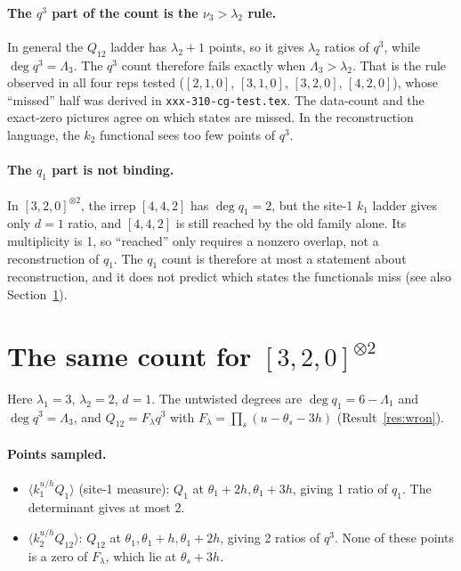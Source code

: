 \documentclass[11pt]{article}
\newcommand{\nb}[1]{\texttt{#1}}
\theoremstyle{definition}
\theoremstyle{remark}
\begin{document}
\paragraph{The $q^3$ part of the count is the $\nu_3>\lambda_2$ rule.} In general the $Q_{12}$ ladder has $\lambda_2+1$ points, so it gives $\lambda_2$ ratios of $q^3$, while $\deg q^3=\Lambda_3$. The $q^3$ count therefore fails exactly when $\Lambda_3>\lambda_2$. That is the rule observed in all four reps tested ($[2,1,0]$, $[3,1,0]$, $[3,2,0]$, $[4,2,0]$), whose ``missed'' half was derived in \nb{xxx-310-cg-test.tex}. The data-count and the exact-zero pictures agree on which states are missed. In the reconstruction language, the $k_2$ functional sees too few points of $q^3$.

\paragraph{The $q_1$ part is not binding.} In $[3,2,0]^{\otimes2}$, the irrep $[4,4,2]$ has $\deg q_1=2$, but the site-1 $k_1$ ladder gives only $d=1$ ratio, and $[4,4,2]$ is still reached by the old family alone. Its multiplicity is 1, so ``reached'' only requires a nonzero overlap, not a reconstruction of $q_1$. The $q_1$ count is therefore at most a statement about reconstruction, and it does not predict which states the functionals miss (see also Section~\ref{sec:320}).

\section{The same count for $[3,2,0]^{\otimes2}$}\label{sec:320}

Here $\lambda_1=3$, $\lambda_2=2$, $d=1$. The untwisted degrees are $\deg q_1=6-\Lambda_1$ and $\deg q^3=\Lambda_3$, and $Q_{12}=F_\lambda q^3$ with $F_\lambda=\prod_s(u-\theta_s-3h)$ (Result~\ref{res:wron}).

\paragraph{Points sampled.}
\begin{itemize}
\item $\langle k_1^{u/h}Q_1\rangle$ (site-1 measure): $Q_1$ at $\theta_1+2h,\theta_1+3h$, giving 1 ratio of $q_1$. The determinant gives at most 2.
\item $\langle k_2^{u/h}Q_{12}\rangle$: $Q_{12}$ at $\theta_1,\theta_1+h,\theta_1+2h$, giving 2 ratios of $q^3$. None of these points is a zero of $F_\lambda$, which lie at $\theta_s+3h$.
\end{itemize}
\end{document}
